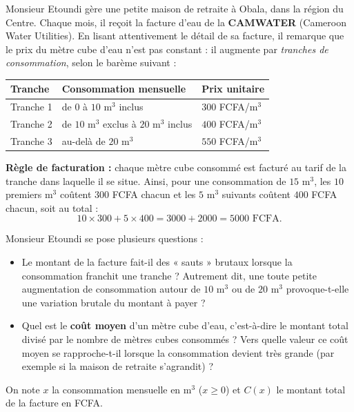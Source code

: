 \documentclass[11pt]{article}
\newcounter{popsec}
\newcounter{popsub}
\newcommand{\courssub}[1]{%
  \stepcounter{popsub}%
  \par\vspace{9pt}\noindent{\popxbold\fontsize{11.5}{13}\selectfont\color{popink}{\color{poporange}\thepopsec.\thepopsub}\hspace{6pt}#1}\par\nopagebreak\vspace{4pt}
}
\begin{document}
Monsieur Etoundi gère une petite maison de retraite à Obala, dans la région du Centre. Chaque mois, il reçoit la facture d'eau de la \textbf{CAMWATER} (Cameroon Water Utilities). En lisant attentivement le détail de sa facture, il remarque que le prix du mètre cube d'eau n'est pas constant : il augmente par \emph{tranches de consommation}, selon le barème suivant :

\begin{center}
\begin{tabularx}{\linewidth}{|l|X|X|}\hline
\rowcolor{popblueL} \textbf{Tranche} & \textbf{Consommation mensuelle} & \textbf{Prix unitaire} \\ \hline
Tranche 1 & de $0$ à $10$ m$^3$ inclus & $300$ FCFA/m$^3$ \\ \hline
Tranche 2 & de $10$ m$^3$ exclus à $20$ m$^3$ inclus & $400$ FCFA/m$^3$ \\ \hline
Tranche 3 & au-delà de $20$ m$^3$ & $550$ FCFA/m$^3$ \\ \hline
\end{tabularx}
\end{center}

\textbf{Règle de facturation :} chaque mètre cube consommé est facturé au tarif de la tranche dans laquelle il se situe. Ainsi, pour une consommation de $15$ m$^3$, les $10$ premiers m$^3$ coûtent $300$ FCFA chacun et les $5$ m$^3$ suivants coûtent $400$ FCFA chacun, soit au total :
\[ 10 \times 300 + 5 \times 400 = 3000 + 2000 = 5000 \text{ FCFA.} \]

Monsieur Etoundi se pose plusieurs questions :
\begin{itemize}
\item Le montant de la facture fait-il des « sauts » brutaux lorsque la consommation franchit une tranche ? Autrement dit, une toute petite augmentation de consommation autour de $10$ m$^3$ ou de $20$ m$^3$ provoque-t-elle une variation brutale du montant à payer ?
\item Quel est le \textbf{coût moyen} d'un mètre cube d'eau, c'est-à-dire le montant total divisé par le nombre de mètres cubes consommés ? Vers quelle valeur ce coût moyen se rapproche-t-il lorsque la consommation devient très grande (par exemple si la maison de retraite s'agrandit) ?
\end{itemize}

On note $x$ la consommation mensuelle en m$^3$ ($x \geq 0$) et $C(x)$ le montant total de la facture en FCFA.

\courssub{Consignes}
\end{document}
